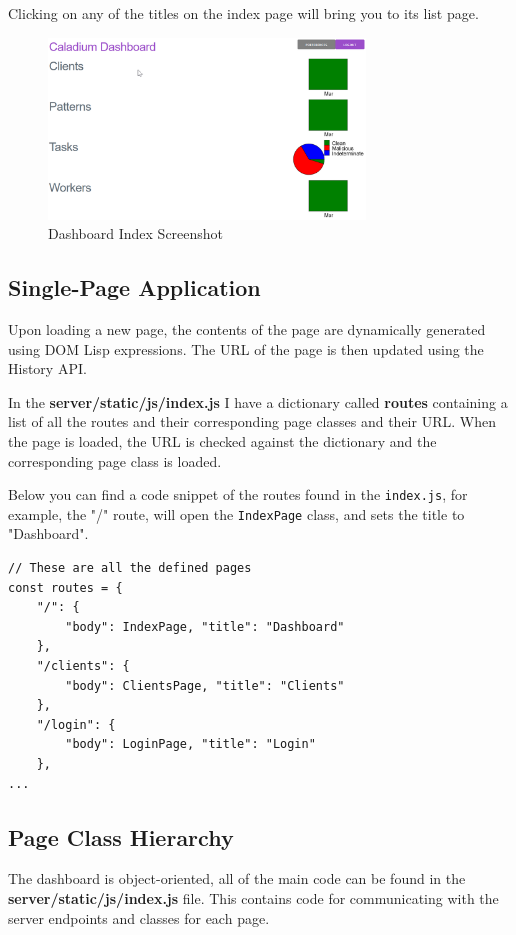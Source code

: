 Clicking on any of the titles on the index page will bring you to its list page.

\begin{figure}[h!]
    \centering
    \includegraphics[width=0.75\textwidth]{../docs/dashboard.png}
    \caption{Dashboard Index Screenshot}
    \label{image:dashboardScreenshot}
\end{figure}

\subsection{Single-Page Application}
Upon loading a new page, the contents of the page are
dynamically generated using DOM Lisp expressions.
The URL of the page is then updated using the History API.

In the \textbf{server/static/js/index.js} I have a dictionary called
\textbf{routes} containing a list of all the routes and their corresponding
page classes and their URL.
When the page is loaded, the URL is checked against the dictionary
and the corresponding page class is loaded.

Below you can find a code snippet of the routes found in the \texttt{index.js},
for example, the "/" route, will open the \texttt{IndexPage} class,
and sets the title to "Dashboard".
\begin{lstlisting}
// These are all the defined pages
const routes = {
    "/": {
        "body": IndexPage, "title": "Dashboard"
    },
    "/clients": {
        "body": ClientsPage, "title": "Clients"
    },
    "/login": {
        "body": LoginPage, "title": "Login"
    },
...
\end{lstlisting}

\subsection {Page Class Hierarchy}
The dashboard is object-oriented, all of the main code can be found in
the \textbf{server/static/js/index.js} file.
This contains code for communicating with
the server endpoints and classes for each page.


